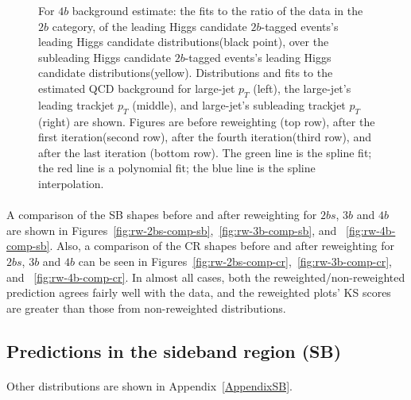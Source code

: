 \begin{figure}[htbp!]
\begin{center}
\caption{For $4b$ background estimate: the fits to the ratio of the data in the $2b$ category, of the leading Higgs candidate $2b$-tagged events's leading Higgs candidate distributions(black point), over the subleading Higgs candidate $2b$-tagged events's leading Higgs candidate distributions(yellow). Distributions and fits to the estimated QCD background for large-\R jet $p_{T}$ (left),  the large-\R jet's leading trackjet $p_T$ (middle), and large-\R jet's subleading trackjet $p_T$ (right) are shown.  Figures are before reweighting (top row), after the first iteration(second row), after the fourth iteration(third row), and after the last iteration (bottom row). The green line is the spline fit; the red line is a polynomial fit; the blue line is the spline interpolation.}
\label{fig:rw-4b-subl}
\end{center}
\end{figure}


\paragraph{}
A comparison of the SB shapes before and after reweighting for $2bs$, $3b$ and $4b$ are shown in Figures~\ref{fig:rw-2bs-comp-sb},~\ref{fig:rw-3b-comp-sb}, and ~\ref{fig:rw-4b-comp-sb}. 
Also, a comparison of the CR shapes before and after reweighting for $2bs$, $3b$ and $4b$ can be seen in Figures~\ref{fig:rw-2bs-comp-cr},~\ref{fig:rw-3b-comp-cr}, and ~\ref{fig:rw-4b-comp-cr}. 
In almost all cases, both the reweighted/non-reweighted prediction agrees fairly well with the data, and the reweighted plots' KS scores are greater than those from non-reweighted distributions. 


\subsection{Predictions in the sideband region (SB)}
\label{sec:boosted-sb}

\paragraph{}
Other distributions are shown in Appendix~\ref{AppendixSB}.


